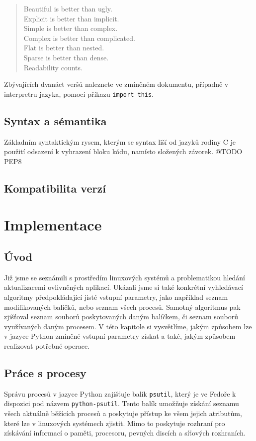 \documentclass[10pt,a4paper]{article}
\begin{document}
		\begin{verse}
		Beautiful is better than ugly.\\
		Explicit is better than implicit.\\
		Simple is better than complex.\\
		Complex is better than complicated.\\
		Flat is better than nested.\\
		Sparse is better than dense.\\
		Readability counts.\\
		\end{verse}

		Zbývajících dvanáct veršů naleznete ve zmíněném dokumentu, případně v interpretru jazyka, pomocí příkazu \texttt{import this}.

		\subsection{Syntax a sémantika}
		Základním syntaktickým rysem, kterým se syntax liší od jazyků rodiny C je použití odsazení k vyhrazení bloku kódu, namísto složených závorek.
		@TODO PEP8


		\subsection{Kompatibilita verzí}

	\section{Implementace}
		\subsection{Úvod}
		Již jsme se seznámili s prostředím linuxových systémů a problematikou hledání aktualizacemi ovlivněných aplikací. Ukázali jsme si také konkrétní vyhledávací algoritmy předpokládající jisté vstupní parametry, jako například seznam modifikovaných balíčků, nebo seznam všech procesů. Samotný algoritmus pak zjišťoval seznam souborů poskytovaných daným balíčkem, či seznam souborů využívaných daným procesem. V této kapitole si vysvětlíme, jakým způsobem lze v jazyce Python zmíněné vstupní parametry získat a také, jakým způsobem realizovat potřebné operace.

		\subsection{Práce s procesy}
		Správu procesů v jazyce Python zajišťuje balík \texttt{psutil}, který je ve Fedoře k dispozici pod názvem \texttt{python-psutil}. Tento balík umožňuje získání seznamu všech aktuálně běžících procesů a poskytuje přístup ke všem jejich atributům, které lze v linuxových systémech zjistit. Mimo to poskytuje rozhraní pro získávání informací o paměti, procesoru, pevných discích a síťových rozhraních.
\end{document}
